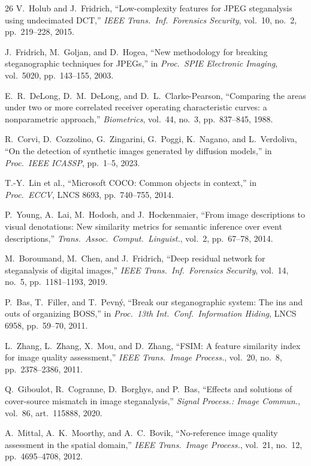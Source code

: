 \documentclass[10pt,twocolumn,a4paper]{article}
\begin{document}
\begin{thebibliography}{26}
V.~Holub and J.~Fridrich,
``Low-complexity features for JPEG steganalysis using undecimated DCT,''
\textit{IEEE Trans.\ Inf.\ Forensics Security}, vol.~10, no.~2, pp.~219--228, 2015.

J.~Fridrich, M.~Goljan, and D.~Hogea,
``New methodology for breaking steganographic techniques for JPEGs,''
in \textit{Proc.\ SPIE Electronic Imaging}, vol.~5020, pp.~143--155, 2003.


E.~R.~DeLong, D.~M.~DeLong, and D.~L.~Clarke-Pearson,
``Comparing the areas under two or more correlated receiver operating characteristic curves: a nonparametric approach,''
\textit{Biometrics}, vol.~44, no.~3, pp.~837--845, 1988.

R.~Corvi, D.~Cozzolino, G.~Zingarini, G.~Poggi, K.~Nagano, and L.~Verdoliva,
``On the detection of synthetic images generated by diffusion models,''
in \textit{Proc.\ IEEE ICASSP}, pp.~1--5, 2023.

T.-Y.~Lin et al.,
``Microsoft COCO: Common objects in context,''
in \textit{Proc.\ ECCV}, LNCS 8693, pp.~740--755, 2014.

P.~Young, A.~Lai, M.~Hodosh, and J.~Hockenmaier,
``From image descriptions to visual denotations: New similarity metrics for semantic inference over event descriptions,''
\textit{Trans.\ Assoc.\ Comput.\ Linguist.}, vol.~2, pp.~67--78, 2014.

M.~Boroumand, M.~Chen, and J.~Fridrich,
``Deep residual network for steganalysis of digital images,''
\textit{IEEE Trans.\ Inf.\ Forensics Security}, vol.~14, no.~5, pp.~1181--1193, 2019.

P.~Bas, T.~Filler, and T.~Pevn\'{y},
``Break our steganographic system: The ins and outs of organizing BOSS,''
in \textit{Proc.\ 13th Int.\ Conf.\ Information Hiding}, LNCS 6958, pp.~59--70, 2011.

L.~Zhang, L.~Zhang, X.~Mou, and D.~Zhang,
``FSIM: A feature similarity index for image quality assessment,''
\textit{IEEE Trans.\ Image Process.}, vol.~20, no.~8, pp.~2378--2386, 2011.

Q.~Giboulot, R.~Cogranne, D.~Borghys, and P.~Bas,
``Effects and solutions of cover-source mismatch in image steganalysis,''
\textit{Signal Process.: Image Commun.}, vol.~86, art.~115888, 2020.

A.~Mittal, A.~K.~Moorthy, and A.~C.~Bovik,
``No-reference image quality assessment in the spatial domain,''
\textit{IEEE Trans.\ Image Process.}, vol.~21, no.~12, pp.~4695--4708, 2012.


\end{thebibliography}
\end{document}
